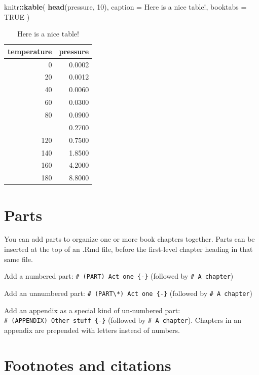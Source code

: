 \documentclass[
]{book}
\newenvironment{Shaded}{\begin{snugshade}}{\end{snugshade}}
\newcommand{\AttributeTok}[1]{\textcolor[rgb]{0.13,0.29,0.53}{#1}}
\newcommand{\ConstantTok}[1]{\textcolor[rgb]{0.56,0.35,0.01}{#1}}
\newcommand{\DecValTok}[1]{\textcolor[rgb]{0.00,0.00,0.81}{#1}}
\newcommand{\FunctionTok}[1]{\textcolor[rgb]{0.13,0.29,0.53}{\textbf{#1}}}
\newcommand{\NormalTok}[1]{#1}
\newcommand{\SpecialCharTok}[1]{\textcolor[rgb]{0.81,0.36,0.00}{\textbf{#1}}}
\newcommand{\StringTok}[1]{\textcolor[rgb]{0.31,0.60,0.02}{#1}}
\theoremstyle{definition}
\theoremstyle{definition}
\theoremstyle{definition}
\theoremstyle{definition}
\theoremstyle{remark}
\begin{document}
\begin{Shaded}
\begin{Highlighting}[]
\NormalTok{knitr}\SpecialCharTok{::}\FunctionTok{kable}\NormalTok{(}
  \FunctionTok{head}\NormalTok{(pressure, }\DecValTok{10}\NormalTok{), }\AttributeTok{caption =} \StringTok{\textquotesingle{}Here is a nice table!\textquotesingle{}}\NormalTok{,}
  \AttributeTok{booktabs =} \ConstantTok{TRUE}
\NormalTok{)}
\end{Highlighting}
\end{Shaded}

\begin{table}

\caption{\label{tab:nice-tab}Here is a nice table!}
\centering
\begin{tabular}[t]{rr}
\toprule
temperature & pressure\\
\midrule
0 & 0.0002\\
20 & 0.0012\\
40 & 0.0060\\
60 & 0.0300\\
80 & 0.0900\\
\addlinespace
100 & 0.2700\\
120 & 0.7500\\
140 & 1.8500\\
160 & 4.2000\\
180 & 8.8000\\
\bottomrule
\end{tabular}
\end{table}

\chapter{Parts}\label{parts}

You can add parts to organize one or more book chapters together. Parts can be inserted at the top of an .Rmd file, before the first-level chapter heading in that same file.

Add a numbered part: \texttt{\#\ (PART)\ Act\ one\ \{-\}} (followed by \texttt{\#\ A\ chapter})

Add an unnumbered part: \texttt{\#\ (PART\textbackslash{}*)\ Act\ one\ \{-\}} (followed by \texttt{\#\ A\ chapter})

Add an appendix as a special kind of un-numbered part: \texttt{\#\ (APPENDIX)\ Other\ stuff\ \{-\}} (followed by \texttt{\#\ A\ chapter}). Chapters in an appendix are prepended with letters instead of numbers.

\chapter{Footnotes and citations}\label{footnotes-and-citations}
\end{document}
